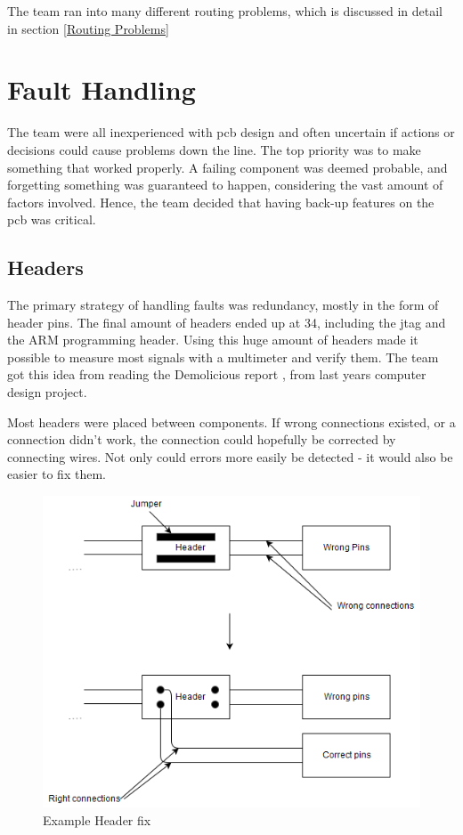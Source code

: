 The team ran into many different routing problems, which is discussed in detail in section \ref{Routing Problems}

\section{Fault Handling}
The team were all inexperienced with \gls{pcb} design and often uncertain if actions or decisions could cause problems down the line.
The top priority was to make something that worked properly.
A failing component was deemed probable, and forgetting something was guaranteed to happen, considering the vast amount of factors involved.
Hence, the team decided that having back-up features on the \gls{pcb} was critical.

\subsection{Headers}
The primary strategy of handling faults was redundancy, mostly in the form of header pins.
The final amount of headers ended up at 34, including the \gls{jtag} and the ARM programming header.
Using this huge amount of headers made it possible to measure most signals with a multimeter and verify them.
The team got this idea from reading the Demolicious report \cite{demolicious-report}, from last years computer design project.

Most headers were placed between components.
If wrong connections existed, or a connection didn't work, the connection could hopefully be corrected by connecting wires.
Not only could errors more easily be detected - it would also be easier to fix them.

\begin{figure}[h!]
\centering
\includegraphics[scale = 0.45]{images/Header_fix.png}
\caption{Example Header fix}
\label{fig:Header fix}
\end{figure}

